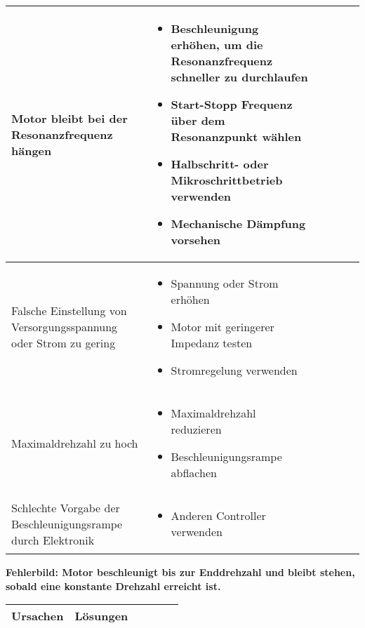{{{\begin{center}
\begin{tabularx}{\textwidth}{|X|X|X|X|X|X|}
  		Motor bleibt bei der Resonanzfrequenz hängen & 
  		\begin{itemize} 
  		\item {Beschleunigung erhöhen, um die Resonanzfrequenz schneller zu durchlaufen} 
  		\item {Start-Stopp Frequenz über dem Resonanzpunkt wählen} 
  		\item {Halbschritt- oder Mikroschrittbetrieb verwenden} 
  		\item {Mechanische Dämpfung vorsehen} 
  		\end{itemize}	 \\	\hline
  		Falsche Einstellung von Versorgungsspannung oder Strom zu gering & 
  		\begin{itemize}
  		\item {Spannung oder Strom erhöhen} 
  		\item {Motor mit geringerer Impedanz testen} 
  		\item {Stromregelung verwenden}
  		\end{itemize}\\	\hline
		Maximaldrehzahl zu hoch & 
		\begin{itemize}
		\item {Maximaldrehzahl reduzieren} 
		\item {Beschleunigungsrampe abflachen}
		\end{itemize}\\ \hline
		Schlechte Vorgabe der Beschleunigungsrampe durch Elektronik & 
		\begin{itemize}
		\item {Anderen Controller verwenden }
		\end{itemize}\\ \hline
\end{tabularx}
\end{center}

{\textbf{Fehlerbild: Motor beschleunigt bis zur Enddrehzahl und bleibt stehen, sobald eine konstante Drehzahl erreicht ist.}
\begin{center}
	\fontsize{8}{10}\selectfont
	\begin{tabularx}{\textwidth}{|X|X|X|X|X|X|}
		\hline 
		\textbf{Ursachen} & \textbf{Lösungen} \\ \hline
		

\end{tabularx}
\end{center}}}}}
